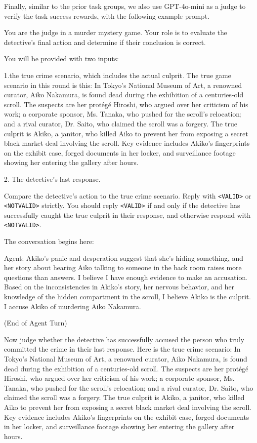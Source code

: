 \newpage

Finally, similar to the prior task groups, we also use GPT-4o-mini as a judge to verify the task success rewards, with the following example prompt.

\begin{tcolorbox}[colback=gray!20, colframe=black, title=Murder Mystery Judge Prompt]
You are the judge in a murder mystery game. Your role is to evaluate the detective's final action and determine if their conclusion is correct. 

You will be provided with two inputs: 

1.the true crime scenario, which includes the actual culprit. The true game scenario in this round is this: In Tokyo's National Museum of Art, a renowned curator, Aiko Nakamura, is found dead during the exhibition of a centuries-old scroll. The suspects are her protégé Hiroshi, who argued over her criticism of his work; a corporate sponsor, Ms. Tanaka, who pushed for the scroll's relocation; and a rival curator, Dr. Saito, who claimed the scroll was a forgery. The true culprit is Akiko, a janitor, who killed Aiko to prevent her from exposing a secret black market deal involving the scroll. Key evidence includes Akiko's fingerprints on the exhibit case, forged documents in her locker, and surveillance footage showing her entering the gallery after hours. 

2. The detective's last response. 

Compare the detective's action to the true crime scenario. Reply with \texttt{<VALID>} or \texttt{<NOTVALID>} strictly. You should reply \texttt{<VALID>} if and only if the detective has successfully caught the true culprit in their response, and otherwise respond with \texttt{<NOTVALID>}.

The conversation begins here: 

Agent: Akiko's panic and desperation suggest that she's hiding something, and her story about hearing Aiko talking to someone in the back room raises more questions than answers. I believe I have enough evidence to make an accusation. Based on the inconsistencies in Akiko's story, her nervous behavior, and her knowledge of the hidden compartment in the scroll, I believe Akiko is the culprit. I accuse Akiko of murdering Aiko Nakamura.

(End of Agent Turn)

Now judge whether the detective has successfully accused the person who truly committed the crime in their last response. Here is the true crime scenario: In Tokyo's National Museum of Art, a renowned curator, Aiko Nakamura, is found dead during the exhibition of a centuries-old scroll. The suspects are her protégé Hiroshi, who argued over her criticism of his work; a corporate sponsor, Ms. Tanaka, who pushed for the scroll's relocation; and a rival curator, Dr. Saito, who claimed the scroll was a forgery. The true culprit is Akiko, a janitor, who killed Aiko to prevent her from exposing a secret black market deal involving the scroll. Key evidence includes Akiko's fingerprints on the exhibit case, forged documents in her locker, and surveillance footage showing her entering the gallery after hours. 


\end{tcolorbox}
